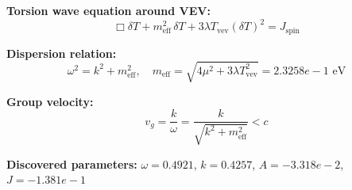 
\textbf{Torsion wave equation around VEV:}
\begin{equation}
  \Box \delta T + m_{\text{eff}}^2 \, \delta T + 3\lambda T_{\text{vev}} (\delta T)^2 = J_{\text{spin}}
\end{equation}

\textbf{Dispersion relation:}
\begin{equation}
  \omega^2 = k^2 + m_{\text{eff}}^2, \quad
  m_{\text{eff}} = \sqrt{4\mu^2 + 3\lambda T_{\text{vev}}^2} = 2.3258e-1 \text{ eV}
\end{equation}

\textbf{Group velocity:}
\begin{equation}
  v_g = \frac{k}{\omega} = \frac{k}{\sqrt{k^2 + m_{\text{eff}}^2}} < c
\end{equation}

\textbf{Discovered parameters:}
$\omega = 0.4921$, \quad
$k = 0.4257$, \quad
$A = -3.318e-2$, \quad
$J = -1.381e-1$